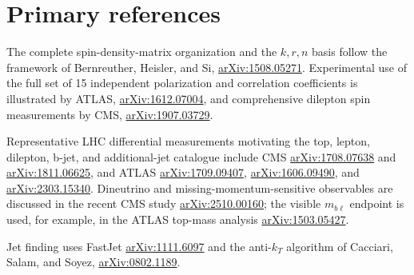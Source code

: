\documentclass[10pt,a4paper]{article}
\begin{document}
\section{Primary references}

The complete spin-density-matrix organization and the \(k,r,n\) basis follow
the framework of Bernreuther, Heisler, and Si,
\href{https://arxiv.org/abs/1508.05271}{arXiv:1508.05271}.  Experimental use
of the full set of 15 independent polarization and correlation coefficients
is illustrated by ATLAS,
\href{https://arxiv.org/abs/1612.07004}{arXiv:1612.07004}, and comprehensive
dilepton spin measurements by CMS,
\href{https://arxiv.org/abs/1907.03729}{arXiv:1907.03729}.

Representative LHC differential measurements motivating the top, lepton,
dilepton, b-jet, and additional-jet catalogue include CMS
\href{https://arxiv.org/abs/1708.07638}{arXiv:1708.07638} and
\href{https://arxiv.org/abs/1811.06625}{arXiv:1811.06625}, and ATLAS
\href{https://arxiv.org/abs/1709.09407}{arXiv:1709.09407},
\href{https://arxiv.org/abs/1606.09490}{arXiv:1606.09490}, and
\href{https://arxiv.org/abs/2303.15340}{arXiv:2303.15340}.  Dineutrino and
missing-momentum-sensitive observables are discussed in the recent CMS study
\href{https://arxiv.org/abs/2510.00160}{arXiv:2510.00160}; the visible
\(m_{b\ell}\) endpoint is used, for example, in the ATLAS top-mass analysis
\href{https://arxiv.org/abs/1503.05427}{arXiv:1503.05427}.

Jet finding uses FastJet
\href{https://arxiv.org/abs/1111.6097}{arXiv:1111.6097} and the anti-\(k_T\)
algorithm of Cacciari, Salam, and Soyez,
\href{https://arxiv.org/abs/0802.1189}{arXiv:0802.1189}.
\end{document}
